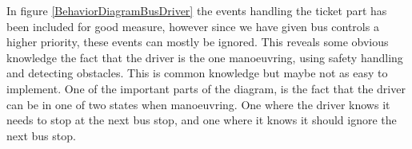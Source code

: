 In figure \ref{BehaviorDiagramBusDriver} the events handling the ticket part has been included for good measure, however since we have given bus controls a higher priority, these events can mostly be ignored. This reveals some obvious knowledge the fact that the driver is the one manoeuvring, using safety handling and detecting obstacles. This is common knowledge but maybe not as easy to implement. One of the important parts of the diagram, is the fact that the driver can be in one of two states when manoeuvring. One where the driver knows it needs to stop at the next bus stop, and one where it knows it should ignore the next bus stop. 
